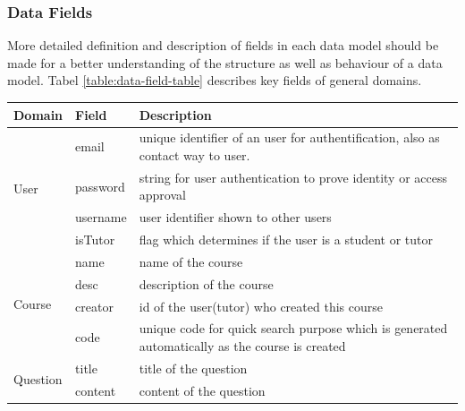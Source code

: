 \subsubsection{ Data Fields }

More detailed definition and description of fields in each data model should be made for a better understanding of the structure as well as behaviour of a data model. Tabel \ref{table:data-field-table} describes key fields of general domains.


\begin{table}[]
\centering
\begin{tabularx}{\textwidth}{@{}llX@{}}
\toprule
Domain                    & Field           & Description                                                                                    \\ \midrule
\multirow{4}{*}{User}     & email           & unique identifier of an user for authentification, also as contact way to user.                \\
                          & password        & string for user authentication to prove identity or access approval                            \\
                          & username        & user identifier shown to other users                                                           \\
                          & isTutor         & flag which determines if the user is a student or tutor                                        \\ \midrule
\multirow{4}{*}{Course}   & name            & name of the course                                                                             \\
                          & desc            & description of the course                                                                      \\
                          & creator         & id of the user(tutor) who created this course                                                  \\
                          & code            & unique code for quick search purpose which is generated automatically as the course is created \\ \midrule
\multirow{5}{*}{Question} & title           & title of the question                                                                          \\
                          & content         & content of the question                                                                        \\

\end{tabularx}
\end{table}
